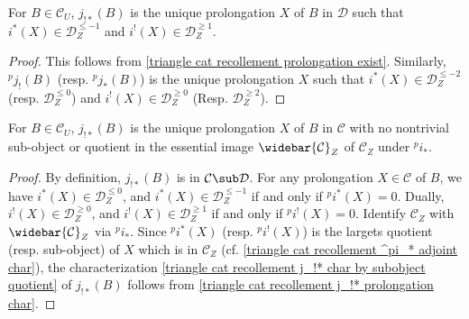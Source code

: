 \begin{corollary}\label{triangle cat recollement j_!* prolongation char}
For $B\in\mathcal{C}_U$, $j_{!*}(B)$ is the unique prolongation $X$ of $B$ in $\mathcal{D}$ such that $i^*(X)\in\mathcal{D}_Z^{\leq -1}$ and $i^!(X)\in\mathcal{D}_Z^{\geq 1}$.
\end{corollary}
\begin{proof}
This follows from \cref{triangle cat recollement prolongation exist}. Similarly, ${^p\!j_!}(B)$ (resp. ${^p\!j_*}(B)$) is the unique prolongation $X$ such that $i^*(X)\in\mathcal{D}_Z^{\leq -2}$ (resp. $\mathcal{D}_Z^{\leq 0}$) and $i^!(X)\in\mathcal{D}_Z^{\geq 0}$ (Resp. $\mathcal{D}_Z^{\geq 2}$).
\end{proof}

\begin{corollary}\label{triangle cat recollement j_!* char by subobject quotient}
For $B\in\mathcal{C}_U$, $j_{!*}(B)$ is the unique prolongation $X$ of $B$ in $\mathcal{C}$ with no nontrivial sub-object or quotient in the essential image $\widebar{\mathcal{C}}_Z$ of $\mathcal{C}_Z$ under ${^p\!i}_*$.
\end{corollary}
\begin{proof}
By definition, $j_{!*}(B)$ is in $\mathcal{C}\sub\mathcal{D}$. For any prolongation $X\in\mathcal{C}$ of $B$, we have $i^*(X)\in\mathcal{D}_Z^{\leq 0}$, and $i^*(X)\in\mathcal{D}_Z^{\leq -1}$ if and only if ${^p\!i^*}(X)=0$. Dually, $i^!(X)\in\mathcal{D}_Z^{\geq 0}$, and $i^!(X)\in\mathcal{D}_Z^{\geq 1}$ if and only if ${^p\!i^!}(X)=0$. Identify $\mathcal{C}_Z$ with $\widebar{\mathcal{C}}_Z$ via ${^p\!i_*}$. Since ${^p\!i^*}(X)$ (resp. ${^p\!i^!}(X)$) is the largets quotient (resp. sub-object) of $X$ which is in $\mathcal{C}_Z$ (cf. \cref{triangle cat recollement ^pi_* adjoint char}), the characterization \cref{triangle cat recollement j_!* char by subobject quotient} of $j_{!*}(B)$ follows from \cref{triangle cat recollement j_!* prolongation char}.
\end{proof}

